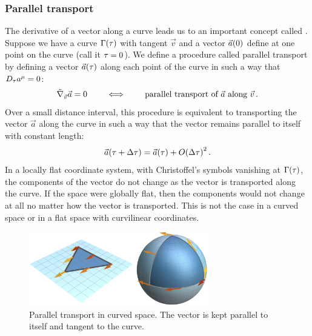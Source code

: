 \subsubsection{Parallel transport}
%
 The derivative of a vector along a curve leads us to an important concept called . Suppose we have a curve $\curve\vat\ptime$ with tangent $\vec v$ and a vector $\vec a\vat 0$ define at one point on the curve (call it $\tau = 0$). We define a procedure called parallel transport by defining a vector $\vec a\vat\ptime$ along each point of the curve in such a way that $D_\ptime\tvec a\mu = 0$:
%
\begin{equation}\label{eq:paralleltransport}
  \cgradcov{\vec v}\vec a = 0\qquad\iff\qquad\text{parallel transport of $\vec a$ along $\vec v$}\,.
\end{equation}
%
Over a small distance interval, this procedure is equivalent to transporting the vector $\vec a$ along the curve in such a way that the vector remains parallel to itself with constant length:
%
\begin{equation*}
  \vec a\vat{\ptime + \Delta\ptime} = \vec a\vat\ptime + O\vat{\Delta\ptime}^2\,.
\end{equation*}
%
In a locally flat coordinate system, with Christoffel's symbols vanishing at $\curve\vat\ptime$, the components of the vector do not change as the vector is transported along the curve. If the space were globally flat, then the components would not change at all no matter how the vector is transported. This is not the case in a curved space or in a flat space with curvilinear coordinates.
%
\begin{figure}[bt]
  \capstart
  \centering
  \includegraphics[width=0.70\textwidth]{./graph/parallel-transport-1}
  \caption{Parallel transport in curved space. The vector is kept parallel to itself and tangent to the curve.}
  \label{fig:paralleltransport}
\end{figure}


